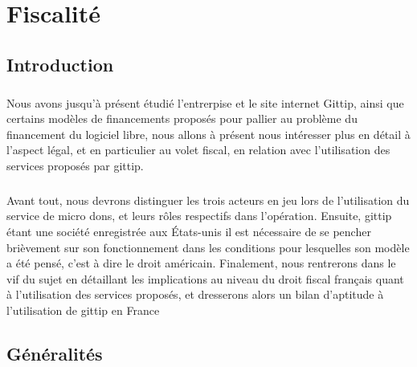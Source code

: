 \chapter{Fiscalité}\label{chapter3}
    \section{Introduction}
        \paragraph{}
            Nous avons jusqu'à présent étudié l'entrerpise et le site
            internet Gittip, ainsi que certains modèles de financements
            proposés pour pallier au problème du financement du logiciel
            libre, nous allons à présent nous intéresser plus en détail
            à l'aspect légal, et en particulier au volet fiscal, en relation
            avec l'utilisation des services proposés par gittip.
        \paragraph{}
            Avant tout, nous devrons distinguer les trois acteurs en jeu
            lors de l'utilisation du service de micro dons, et leurs rôles
            respectifs dans l'opération.
            Ensuite, gittip étant une société enregistrée aux États-unis
            il est nécessaire de se pencher brièvement sur son fonctionnement
            dans les conditions pour lesquelles son modèle a été pensé,
            c'est à dire le droit américain.
            Finalement, nous rentrerons dans le vif du sujet en détaillant les
            implications au niveau du droit fiscal français quant à
            l'utilisation des services proposés, et dresserons alors un bilan
            d'aptitude à l'utilisation de gittip en France

    \section{Généralités}
